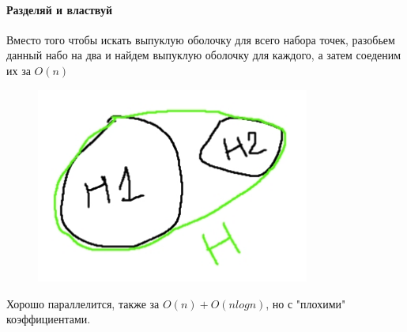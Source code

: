 \paragraph*{Разделяй и властвуй} Вместо того чтобы искать выпуклую оболочку для всего набора точек, разобьем данный набо на два и найдем выпуклую оболочку для каждого, а затем соеденим их за $O(n)$

\begin{figure}[H]
    \centering
    \includegraphics[width = 9cm]{Hull_merging.jpg}
    \caption{}
    \label{fig:float}
\end{figure}

Хорошо параллелится, также за $O(n) + O(nlogn)$, но с "плохими" коэффициентами.